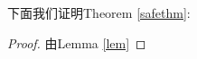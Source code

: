 \documentclass[UTF8]{ctexart}
\theoremstyle{definition}
\theoremstyle{plain}
\begin{document}
下面我们证明Theorem \ref{safethm}:
\begin{proof}
    由Lemma \ref{lem}
\end{proof}








\end{document}
